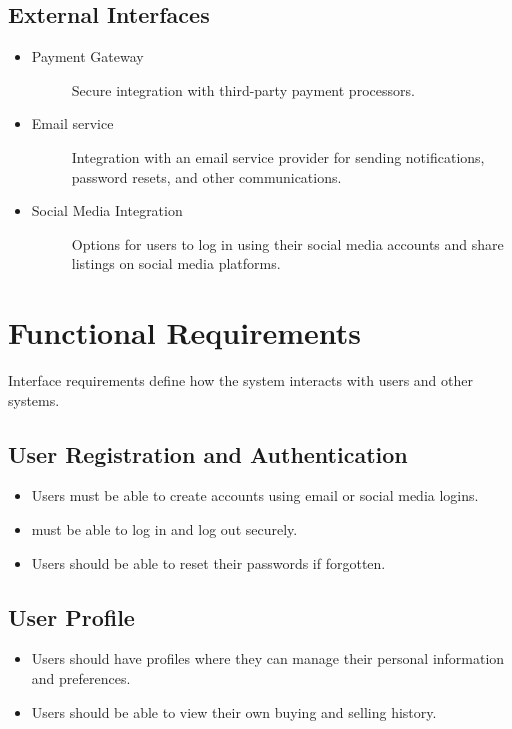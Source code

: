 \subsection{External Interfaces}
\begin{itemize}
    \item \begin{description}
        \item[Payment Gateway] Secure integration with third-party payment processors.
    \end{description}
    \item \begin{description}
        \item[Email service] Integration with an email service provider for sending notifications, password resets, and other communications.
    \end{description}
    \item \begin{description}
        \item[Social Media Integration] Options for users to log in using their social media accounts and share listings on social media platforms.
    \end{description}
\end{itemize} 

\section{Functional Requirements}
Interface requirements define how the system interacts with users and other systems.

\subsection{User Registration and Authentication}
\begin{itemize}
        \item Users must be able to create accounts using email or social media logins.
    
        \item must be able to log in and log out securely.

        \item Users should be able to reset their passwords if forgotten.
\end{itemize}

\subsection{User Profile}
\begin{itemize}
        \item Users should have profiles where they can manage their personal information and preferences.
    
        \item Users should be able to view their own buying and selling history.
\end{itemize}

